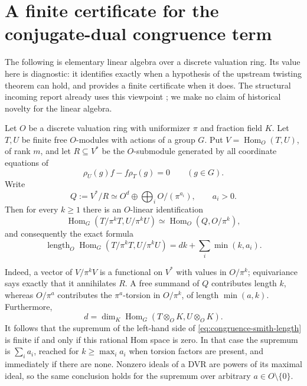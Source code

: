 \section{A finite certificate for the conjugate-dual congruence term}
\label{sec:congruence-smith}

The following is elementary linear algebra over a discrete valuation ring. Its
value here is diagnostic: it identifies exactly when a hypothesis of the
upstream twisting theorem can hold, and provides a finite certificate when it
does. The structural incoming report already uses this viewpoint
\cite{IncomingStructural}; we make no claim of historical novelty for the
linear algebra.

Let $O$ be a discrete valuation ring with uniformizer $\pi$ and fraction field
$K$. Let $T,U$ be finite free $O$-modules with actions of a group $G$. Put
$V=\operatorname{Hom}_O(T,U)$, of rank $m$, and let $R\subseteq V^*$ be the
$O$-submodule generated by all coordinate equations of
\[
 \rho_U(g)f-f\rho_T(g)=0\qquad(g\in G).
\]
Write
\[
 Q:=V^*/R\simeq O^d\oplus\bigoplus_i O/(\pi^{a_i}),\qquad a_i>0.
\]
Then for every $k\geq1$ there is an $O$-linear identification
\[
 \operatorname{Hom}_G(T/\pi^kT,U/\pi^kU)
 \simeq\operatorname{Hom}_O(Q,O/\pi^k),
\]
and consequently the exact formula
\begin{equation}
 \operatorname{length}_O\operatorname{Hom}_G(T/\pi^kT,U/\pi^kU)
   =dk+\sum_i\min(k,a_i).
 \label{eq:congruence-smith-length}
\end{equation}

Indeed, a vector of $V/\pi^kV$ is a functional on $V^*$ with values in
$O/\pi^k$; equivariance says exactly that it annihilates $R$. A free summand
of $Q$ contributes length $k$, whereas $O/\pi^a$ contributes the
$\pi^a$-torsion in $O/\pi^k$, of length $\min(a,k)$. Furthermore,
\[
 d=\dim_K\operatorname{Hom}_G(T\otimes_OK,U\otimes_OK).
\]
It follows that the supremum of the left-hand side of
\eqref{eq:congruence-smith-length} is finite if and only if this rational Hom
space is zero. In that case the supremum is $\sum_i a_i$, reached for
$k\geq\max_i a_i$ when torsion factors are present, and immediately if
there are none. Nonzero ideals of a DVR are powers of its maximal ideal,
so the same conclusion holds for the supremum over arbitrary $a\in O\setminus\{0\}$.

